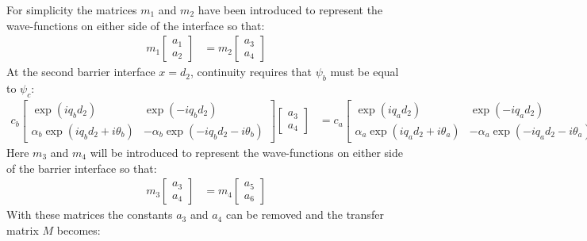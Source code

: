\documentclass[12pt,a4paper]{report}
\begin{document}
			For simplicity the matrices $m_{1}$ and $m_{2}$ have been introduced to represent the wave-functions on either side of the interface so that:
			\begin{align}
				m_{1}\left[\begin{array}{ccc}
					a_{1}\\
					a_{2}
				\end{array}\right]
				&=
				m_{2}\left[\begin{array}{ccc}
					a_{3}\\
					a_{4}
				\end{array}\right]
			\end{align}
			At the second barrier interface $x=d_{2}$, continuity requires that $\psi_{b}$ must be equal to $\psi_{c}$:
			\begin{align}
				c_{b}
				\left[\begin{array}{ccc}
					\exp(iq_{b}d_{2})&\exp(-iq_{b}d_{2})\\
					\alpha_{b}\exp(iq_{b}d_{2}+i\theta_{b})&-\alpha_{b}\exp(-iq_{b}d_{2}-i\theta_{b})
				\end{array}\right]
				\left[\begin{array}{ccc}
					a_{3}\\
					a_{4}
				\end{array}\right]
				&=
				c_{a}
				\left[\begin{array}{ccc}
					\exp(iq_{a}d_{2})&\exp(-iq_{a}d_{2})\\
					\alpha_{a}\exp(iq_{a}d_{2}+i\theta_{a})&-\alpha_{a}\exp(-iq_{a}d_{2}-i\theta_{a})
				\end{array}\right]
				\left[\begin{array}{ccc}
					a_{5}\\
					a_{6}
				\end{array}\right]
			\end{align}
			Here $m_{3}$ and $m_{4}$ will be introduced to represent the wave-functions on either side of the barrier interface so that:
			\begin{align}
				m_{3}\left[\begin{array}{ccc}
					a_{3}\\
					a_{4}
				\end{array}\right]
				&=
				m_{4}\left[\begin{array}{ccc}
					a_{5}\\
					a_{6}
				\end{array}\right]
			\end{align}
			With these matrices the constants $a_{3}$ and $a_{4}$ can be removed and the transfer matrix $M$ becomes:
\end{document}
